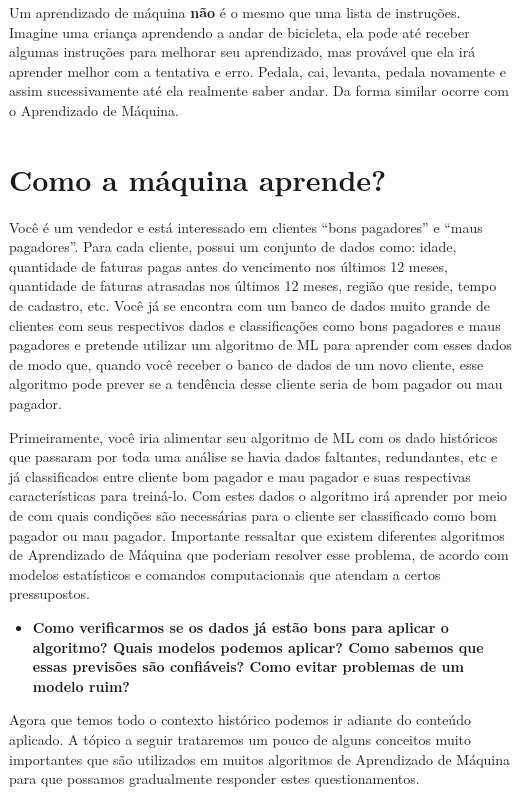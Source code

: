 \documentclass[
]{book}
\providecommand{\tightlist}{%
  \setlength{\itemsep}{0pt}\setlength{\parskip}{0pt}}
\begin{document}
Um aprendizado de máquina \textbf{não} é o mesmo que uma lista de instruções. Imagine uma criança aprendendo a andar de bicicleta, ela pode até receber algumas instruções para melhorar seu aprendizado, mas provável que ela irá aprender melhor com a tentativa e erro. Pedala, cai, levanta, pedala novamente e assim sucessivamente até ela realmente saber andar. Da forma similar ocorre com o Aprendizado de Máquina.

\hypertarget{como-a-muxe1quina-aprende}{%
\section{Como a máquina aprende?}\label{como-a-muxe1quina-aprende}}

Você é um vendedor e está interessado em clientes ``bons pagadores'' e ``maus pagadores''. Para cada cliente, possui um conjunto de dados como: idade, quantidade de faturas pagas antes do vencimento nos últimos 12 meses, quantidade de faturas atrasadas nos últimos 12 meses, região que reside, tempo de cadastro, etc. Você já se encontra com um banco de dados muito grande de clientes com seus respectivos dados e classificações como bons pagadores e maus pagadores e pretende utilizar um algoritmo de ML para aprender com esses dados de modo que, quando você receber o banco de dados de um novo cliente, esse algoritmo pode prever se a tendência desse cliente seria de bom pagador ou mau pagador.

Primeiramente, você iria alimentar seu algoritmo de ML com os dado históricos que passaram por toda uma análise se havia dados faltantes, redundantes, etc e já classificados entre cliente bom pagador e mau pagador e suas respectivas características para treiná-lo. Com estes dados o algoritmo irá aprender por meio de com quais condições são necessárias para o cliente ser classificado como bom pagador ou mau pagador. Importante ressaltar que existem diferentes algoritmos de Aprendizado de Máquina que poderiam resolver esse problema, de acordo com modelos estatísticos e comandos computacionais que atendam a certos pressupostos.

\begin{itemize}
\tightlist
\item
  \textbf{Como verificarmos se os dados já estão bons para aplicar o algoritmo? Quais modelos podemos aplicar? Como sabemos que essas previsões são confiáveis? Como evitar problemas de um modelo ruim?}
\end{itemize}

Agora que temos todo o contexto histórico podemos ir adiante do conteúdo aplicado. A tópico a seguir trataremos um pouco de alguns conceitos muito importantes que são utilizados em muitos algoritmos de Aprendizado de Máquina para que possamos gradualmente responder estes questionamentos.
\end{document}
